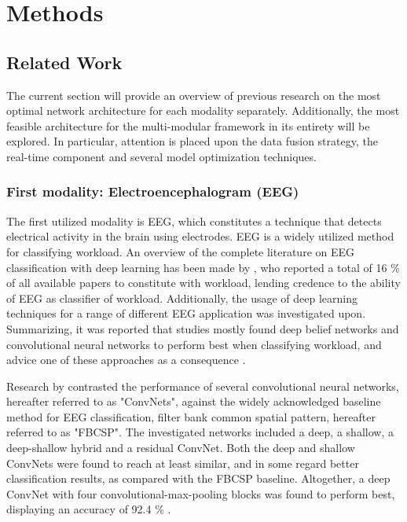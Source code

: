 \documentclass[12pt]{article}
\begin{document}
\section{Methods}

\subsection{Related Work} \label{Relatedwork}
The current section will provide an overview of previous research on the most optimal network architecture for each modality separately. Additionally,  the most feasible architecture for the multi-modular framework in its entirety will be explored. In particular, attention is placed upon the data fusion strategy, the real-time component and several model optimization techniques.

\subsubsection{First modality: Electroencephalogram (EEG)}
The first utilized modality is EEG, which constitutes a technique that detects electrical activity in the brain using electrodes. EEG is a widely utilized method for classifying workload. An overview of the complete literature on EEG classification with deep learning has been made by , who reported a total of 16 \% of all available papers to constitute with workload, lending credence to the ability of EEG as classifier of workload. Additionally, the usage of deep learning techniques for a range of different EEG application was investigated upon. Summarizing, it was reported that studies mostly found deep belief networks and convolutional neural networks to perform best when classifying workload, and advice one of these approaches as a consequence \cite{craik2019deep}.

Research by  contrasted the performance of several convolutional neural networks, hereafter referred to as "ConvNets", against the widely acknowledged baseline method for EEG classification, filter bank common spatial pattern, hereafter referred to as "FBCSP". The investigated networks included a deep, a shallow, a deep-shallow hybrid and a residual ConvNet. Both the deep and shallow ConvNets were found to reach at least similar, and in some regard better classification results, as compared with the FBCSP baseline. Altogether, a deep ConvNet with four convolutional-max-pooling blocks was found to perform best, displaying an accuracy of 92.4 \% \cite{schirrmeister2017deep}.
\end{document}
